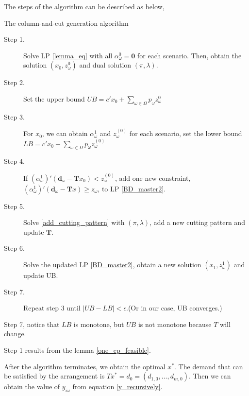 The steps of the algorithm can be described as below,

\begin{algorithm}[H]\label{column_and_cut_algo}
  \caption{The column-and-cut generation algorithm}
    \begin{description}
    \item[Step 1.] Solve LP \eqref{lemma_eq} with all $\alpha_{\omega}^0 = \mathbf{0}$ for each scenario.
    Then, obtain the solution $(x_0, z_{\omega}^{0})$ and dual solution $(\pi, \lambda)$.

    \item[Step 2.] Set the upper bound $UB = c{'} x_0 + \sum_{\omega \in \Omega} p_{\omega} z_{\omega}^{0}$ 
    \item[Step 3.] 
    For $x_0$, we can obtain $\alpha_{\omega}^{1}$ and $z_{\omega}^{(0)}$ for each scenario, set the lower bound $LB = c{'} x_0 + \sum_{\omega \in \Omega} p_{\omega} z_{\omega}^{(0)}$
    
    \item[Step 4.]
    If $(\alpha_{\omega}^{1}){'}(\mathbf{d}_{\omega}- \mathbf{T}x_0) < z_{\omega}^{(0)}$, add one new constraint, $(\alpha_{\omega}^{1}){'}(\mathbf{d}_{\omega}- \mathbf{T}x) \geq z_{\omega}$, to LP \eqref{BD_master2}.
    
    \item[Step 5.]
    Solve \eqref{add_cutting_pattern} with $(\pi,\lambda)$, add a new cutting pattern and update $\mathbf{T}$.
    \vspace{5pt}
    \item[Step 6.] Solve the updated LP \eqref{BD_master2}, obtain a new solution $(x_1, z_{\omega}^{1})$ and update UB.
    \item[Step 7.] Repeat step 3 until $|UB - LB| < \epsilon$.(Or in our case, UB converges.)
   \end{description}
  \end{algorithm}

Step 7, notice that $LB$ is monotone, but $UB$ is not monotone because $T$ will change.

Step 1 results from the lemma \ref{one_ep_feasible}.

After the algorithm terminates, we obtain the optimal $x^{*}$. The demand that can be satisfied by the arrangement is $T x^{*} = d_0 = (d_{1,0},\ldots,d_{m,0})$.
Then we can obtain the value of $y_{i \omega}$ from equation \eqref{y_recursively}.

